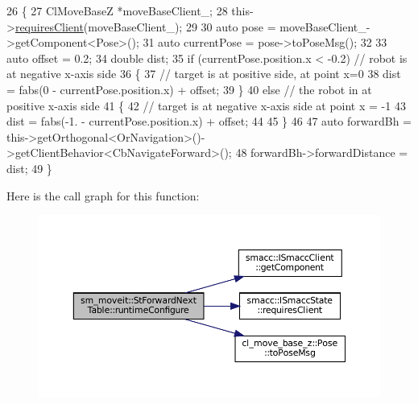 \begin{DoxyCode}
26     \{          
27         ClMoveBaseZ *moveBaseClient\_;
28         this->\hyperlink{classsmacc_1_1ISmaccState_a7f95c9f0a6ea2d6f18d1aec0519de4ac}{requiresClient}(moveBaseClient\_);
29 
30         \textcolor{keyword}{auto} pose = moveBaseClient\_->getComponent<Pose>();
31         \textcolor{keyword}{auto} currentPose = pose->toPoseMsg();
32 
33         \textcolor{keyword}{auto} offset = 0.2;
34         \textcolor{keywordtype}{double} dist;
35         \textcolor{keywordflow}{if} (currentPose.position.x < -0.2) \textcolor{comment}{// robot is at negative x-axis side}
36         \{
37                 \textcolor{comment}{// target is at positive side, at point x=0}
38                 dist = fabs(0 - currentPose.position.x) + offset;
39         \}
40         \textcolor{keywordflow}{else} \textcolor{comment}{// the robot in at positive x-axis side}
41         \{
42                 \textcolor{comment}{// target is at negative x-axis side at point x = -1}
43                 dist = fabs(-1. - currentPose.position.x) + offset;
44              
45         \}
46 
47         \textcolor{keyword}{auto} forwardBh = this->getOrthogonal<OrNavigation>()->getClientBehavior<CbNavigateForward>();
48         forwardBh->forwardDistance = dist;
49     \}
\end{DoxyCode}
Here is the call graph for this function\+:
\nopagebreak
\begin{figure}[H]
\begin{center}
\leavevmode
\includegraphics[width=350pt]{structsm__moveit_1_1StForwardNextTable_a4f6c466efdb91b0eb9aaee71f87a4fc4_cgraph}
\end{center}
\end{figure}
\mbox{\label{structsm__moveit_1_1StForwardNextTable_a2f28979d2a049e53b91802421771bcfb}} 
